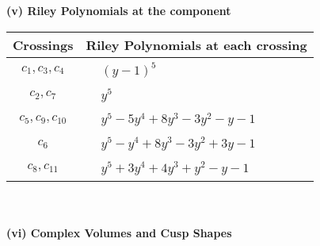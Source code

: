 \documentclass[1p]{elsarticle_modified}
\theoremstyle{definition}
\begin{document}
\newpage\renewcommand{\arraystretch}{1}
\flushleft \textbf{(v) Riley Polynomials at the component}\newline \\
\begin{tabular}{m{50pt}|m{274pt}}
Crossings & \hspace{64pt}Riley Polynomials at each crossing \\
\hline $$\begin{aligned}c_{1},c_{3},c_{4}\end{aligned}$$&$\begin{aligned}
&(y-1)^5
\end{aligned}$\\
\hline $$\begin{aligned}c_{2},c_{7}\end{aligned}$$&$\begin{aligned}
&y^5
\end{aligned}$\\
\hline $$\begin{aligned}c_{5},c_{9},c_{10}\end{aligned}$$&$\begin{aligned}
&y^5-5 y^4+8 y^3-3 y^2- y-1
\end{aligned}$\\
\hline $$\begin{aligned}c_{6}\end{aligned}$$&$\begin{aligned}
&y^5- y^4+8 y^3-3 y^2+3 y-1
\end{aligned}$\\
\hline $$\begin{aligned}c_{8},c_{11}\end{aligned}$$&$\begin{aligned}
&y^5+3 y^4+4 y^3+y^2- y-1
\end{aligned}$\\
\hline
\end{tabular}\\~\\
\newpage\flushleft \textbf{(vi) Complex Volumes and Cusp Shapes}
\end{document}
